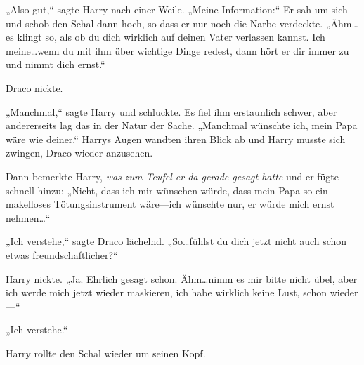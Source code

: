 „Also gut,“ sagte Harry nach einer Weile. „Meine Information:“ Er sah um sich und schob den Schal dann hoch, so dass er nur noch die Narbe verdeckte. „Ähm…es klingt so, als ob du dich wirklich auf deinen Vater verlassen kannst. Ich meine…wenn du mit ihm über wichtige Dinge redest, dann hört er dir immer zu und nimmt dich ernst.“

Draco nickte.

„Manchmal,“ sagte Harry und schluckte. Es fiel ihm erstaunlich schwer, aber andererseits lag das in der Natur der Sache. „Manchmal wünschte ich, mein Papa wäre wie deiner.“ Harrys Augen wandten ihren Blick ab und Harry musste sich zwingen, Draco wieder anzusehen.

Dann bemerkte Harry, \emph{was zum Teufel er da gerade gesagt hatte} und er fügte schnell hinzu: „Nicht, dass ich mir wünschen würde, dass mein Papa so ein makelloses Tötungsinstrument wäre—ich wünschte nur, er würde mich ernst nehmen…“

„Ich verstehe,“ sagte Draco lächelnd. „So…fühlst du dich jetzt nicht auch schon etwas freundschaftlicher?“

Harry nickte. „Ja. Ehrlich gesagt schon. Ähm…nimm es mir bitte nicht übel, aber ich werde mich jetzt wieder maskieren, ich habe wirklich keine Lust, schon wieder—“

„Ich verstehe.“

Harry rollte den Schal wieder um seinen Kopf.

